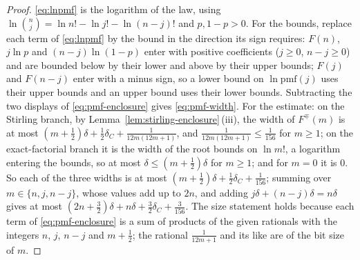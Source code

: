 \begin{proof}
\eqref{eq:lnpmf} is the logarithm of the law, using
$\ln\binom{n}{j}=\ln n!-\ln j!-\ln(n-j)!$ and $p,1-p>0$. For the bounds,
replace each term of \eqref{eq:lnpmf} by the bound in the direction its
sign requires: $F(n)$, $j\ln p$ and $(n-j)\ln(1-p)$ enter with positive
coefficients ($j\ge0$, $n-j\ge0$) and are bounded below by their lower and
above by their upper bounds; $F(j)$ and $F(n-j)$ enter with a minus sign, so
a lower bound on $\ln\mathrm{pmf}(j)$ uses their upper bounds and an upper
bound uses their lower bounds. Subtracting the two displays of
\eqref{eq:pmf-enclosure} gives \eqref{eq:pmf-width}. For the estimate: on
the Stirling branch, by Lemma~\ref{lem:stirling-enclosure}\,(iii), the width
of $F^{\mp}(m)$ is at most
$(m+\tfrac12)\delta+\tfrac12\delta_C+\tfrac{1}{12m(12m+1)}$, and
$\frac{1}{12m(12m+1)}\le\frac{1}{156}$ for $m\ge1$; on the exact-factorial
branch it is the width of the root bounds on $\ln m!$, a logarithm entering
the bounds, so at most $\delta\le(m+\tfrac12)\delta$ for $m\ge1$; and for
$m=0$ it is $0$. So each of the three widths is at most
$(m+\tfrac12)\delta+\tfrac12\delta_C+\tfrac{1}{156}$; summing over
$m\in\{n,j,n-j\}$, whose values add up to $2n$, and adding
$j\delta+(n-j)\delta=n\delta$ gives at most
$(2n+\tfrac32)\delta+n\delta+\tfrac32\delta_C+\tfrac{3}{156}$. The size
statement holds because each term of \eqref{eq:pmf-enclosure} is a sum of
products of the given rationals with the integers $n$, $j$, $n-j$ and
$m+\tfrac12$; the rational $\frac{1}{12m+1}$ and its like are of the bit
size of $m$.
\end{proof}
